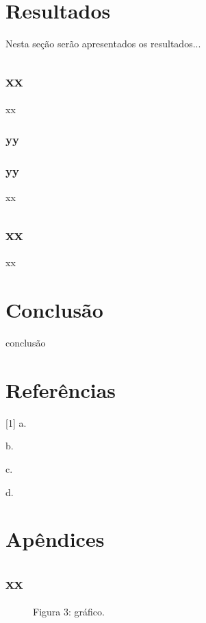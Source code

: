 \documentclass[12pt]{article}
\begin{document}
\newpage
\section{Resultados}

Nesta seção serão apresentados os resultados...

\subsection{xx}

xx

\subsubsection{yy}

\newpage
\subsubsection{yy}

xx 

\newpage
\subsection{xx}

xx

\newpage
\section{Conclusão}

conclusão

\newpage
\section{Referências}

[1] a.

\noindent [2] b.

\noindent [3] c.

\noindent [4] d.

\newpage
\section{Apêndices}

\subsection{xx}


\begin{figure}[H]

\begin{center}
Figura 3: gráfico.
\end{center}
\end{figure}
\end{document}
